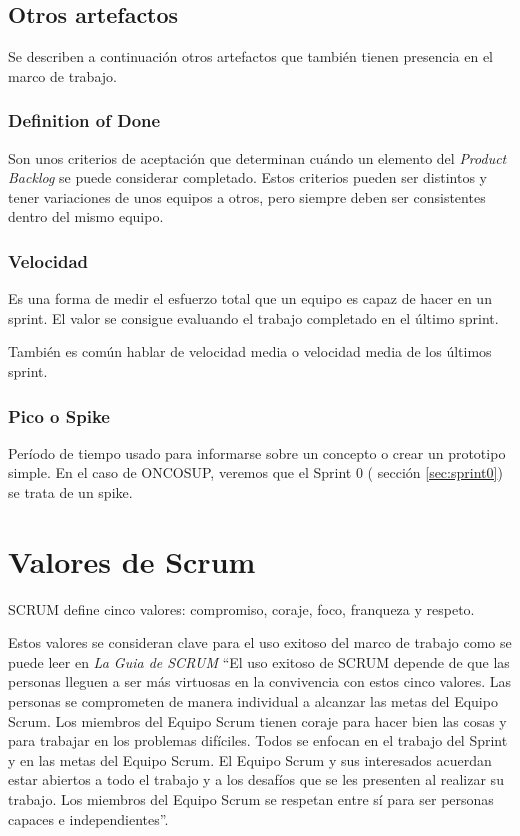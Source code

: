 \subsection{Otros artefactos}
\label{otrosArtefactos}

Se describen a continuación otros artefactos que también tienen presencia en el marco de trabajo.

\subsubsection{Definition of Done}
\label{definitionDone}

Son unos criterios de aceptación que determinan cuándo un elemento del \emph{Product Backlog} se puede considerar completado. Estos criterios pueden ser distintos y tener variaciones de unos equipos a otros, pero siempre deben ser consistentes dentro del mismo equipo.

\subsubsection{Velocidad}
\label{velocidad}

Es una forma de medir el esfuerzo total que un equipo es capaz de hacer en un sprint. El valor se consigue evaluando el trabajo completado en el último sprint. 

También es común hablar de velocidad media o velocidad media de los últimos sprint.

\subsubsection{Pico o Spike}
\label{spike}
Período de tiempo usado para informarse sobre un concepto o crear un prototipo simple. En el caso de ONCOSUP, veremos que el Sprint 0 ( sección \ref{sec:sprint0}) se trata de un spike.

\section{Valores de Scrum}
\label{valores}

SCRUM define cinco valores: compromiso, coraje, foco, franqueza y respeto.

Estos valores se consideran clave para el uso exitoso del marco de trabajo como se puede leer en \emph{La Guia de SCRUM} \cite{guiaScrum} ``El uso exitoso de SCRUM depende de que las personas lleguen a ser más virtuosas en la convivencia con estos cinco valores. Las personas se comprometen de manera individual a alcanzar las metas del Equipo Scrum. Los miembros del Equipo Scrum tienen coraje para hacer bien las cosas y para trabajar en los problemas difíciles. Todos se enfocan en el trabajo del Sprint y en las metas del Equipo Scrum. El Equipo Scrum y sus interesados acuerdan estar abiertos a todo el trabajo y a los desafíos que se les presenten al realizar su trabajo. Los miembros del Equipo Scrum se respetan entre sí para ser personas capaces e independientes''.

